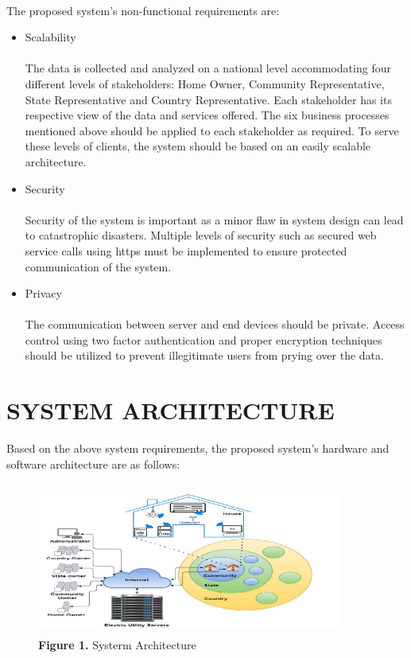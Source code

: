 \documentclass[a4paper,12pt,oneside]{article}
\let\counterwithin\relax
\begin{document}
\paragraph{}
The proposed system’s non-functional requirements are:
\begin{itemize}
    \item Scalability
    \paragraph{}The data is collected and analyzed on a national level
    accommodating four different levels of stakeholders: Home
    Owner, Community Representative, State Representative
    and Country Representative. Each stakeholder has
    its respective view of the data and services offered. The
    six business processes mentioned above should be applied
    to each stakeholder as required. To serve these levels of
    clients, the system should be based on an easily scalable
    architecture.
    \item Security
    \paragraph{}Security of the system is important as a minor flaw in
    system design can lead to catastrophic disasters. Multiple
    levels of security such as secured web service calls using https
    must be implemented to ensure protected communication of
    the system.
    \item Privacy
    \paragraph{}
    The communication between server and end devices should
    be private. Access control using two factor authentication and
    proper encryption techniques should be utilized to prevent
    illegitimate users from prying over the data.
    
\end{itemize}

\newpage
\section{SYSTEM ARCHITECTURE}
Based on the above system requirements, the proposed
system’s hardware and software architecture are as follows:

\begin{figure}[H]
\includegraphics[height=5cm,width=10cm]{figure1.png}
\centering
\caption[Systerm Architecture]{\textbf{Figure 1.} Systerm Architecture}
\end{figure}
\end{document}
